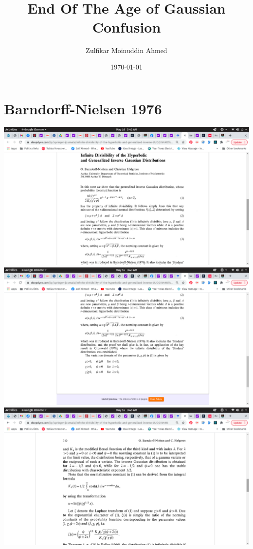 \documentclass{amsart}
\title{End Of The Age of Gaussian Confusion}
\author{Zulfikar Moinuddin Ahmed}
\date{\today}
\begin{document}
\maketitle

\section{Barndorff-Nielsen 1976}

\includegraphics[scale=0.4]{bn1976-1.png}
\includegraphics[scale=0.4]{bn1976-2.png}
\includegraphics[scale=0.4]{bn1976-3.png}
\end{document}
